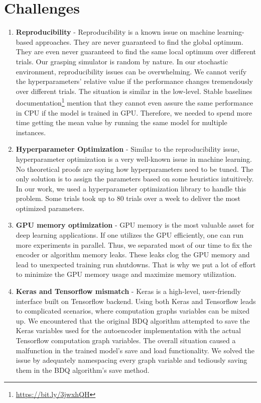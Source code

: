 \section{Challenges}
    \begin{enumerate}
        \item \textbf{Reproducibility} -   Reproducibility is a known issue on machine learning-based approaches. They are never guaranteed to find the global optimum. They are even never guaranteed to find the same local optimum over different trials. Our grasping simulator is random by nature. In our stochastic environment, reproducibility issues can be overwhelming. We cannot verify the hyperparameters' relative value if the performance changes tremendously over different trials. The situation is similar in the low-level. Stable baselines documentation\footnote{\url{https://bit.ly/3jwxhQH}} 
        mention that they cannot even assure the same performance in CPU if the model is trained in GPU. Therefore, we needed to spend more time getting the mean value by running the same model for multiple instances.
        \item \textbf{Hyperparameter Optimization} - Similar to the reproducibility issue, hyperparameter optimization is a very well-known issue in machine learning. No theoretical proofs are saying how hyperparameters need to be tuned. The  only solution is to assign the parameters based on some heuristics intuitively. In our work, we used a hyperparameter optimization library to handle this problem. Some trials took up to 80 trials over a week to deliver the most optimized parameters.
        \item \textbf{GPU memory optimization} - GPU memory is the most valuable asset for deep learning applications. If one utilizes the GPU efficiently, one can run more experiments in parallel. Thus, we separated most of our time to fix the encoder or algorithm memory leaks. These leaks clog the GPU memory and lead to unexpected training run shutdowns. That is why we put a lot of effort to minimize the GPU memory usage and maximize memory utilization.
        \item \textbf{Keras and Tensorflow mismatch} - Keras is a high-level, user-friendly interface built on Tensorflow backend. Using both Keras and Tensorflow leads to complicated scenarios, where computation graphs variables can be mixed up. We encountered that the original BDQ algorithm attempted to save the Keras variables used for the autoencoder implementation with the actual Tensorflow computation graph variables. The overall situation caused a malfunction in the trained model's save and load functionality. We solved the issue by adequately namespacing every graph variable and tediously saving them in the BDQ algorithm's save method.
    \end{enumerate}
  
    